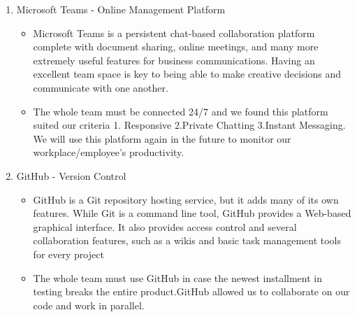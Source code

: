 \begin{enumerate}
    \item  Microsoft Teams - Online Management Platform
   \begin{itemize}
     \item Microsoft Teams is a persistent chat-based collaboration platform complete with document sharing, online meetings, and many more extremely useful features for business communications. Having an excellent team space is key to being able to make creative decisions and communicate with one another.


      \item The whole team must be connected 24/7 and we found this platform suited our criteria 1. Responsive 2.Private Chatting 3.Instant Messaging. We will use this platform again in the future to monitor our workplace/employee's productivity.
   \end{itemize}




 \item  GitHub  - Version Control
   \begin{itemize}
     \item GitHub is a Git repository hosting service, but it adds many of its own features. While Git is a command line tool, GitHub provides a Web-based graphical interface. It also provides access control and several collaboration features, such as a wikis and basic task management tools for every project


      \item The whole team must use GitHub in case the newest installment in testing breaks the entire product.GitHub allowed us to collaborate on our code and work in parallel.
   \end{itemize}


\end{enumerate}



